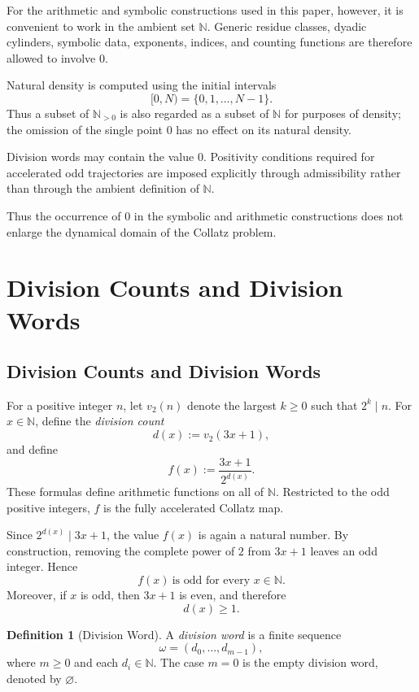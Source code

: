 \documentclass[12pt, oneside]{article}
\numberwithin{equation}{section}
\theoremstyle{definition}
\newtheorem{definition}{Definition}[section]
\theoremstyle{plain}
\theoremstyle{remark}
\begin{document}
For the arithmetic and symbolic constructions used in this paper, however,
it is convenient to work in the ambient set \(\mathbb N\). Generic residue
classes, dyadic cylinders, symbolic data, exponents, indices, and counting
functions are therefore allowed to involve \(0\).

Natural density is computed using the initial intervals
\[
[0,N)=\{0,1,\ldots,N-1\}.
\]
Thus a subset of \(\mathbb N_{>0}\) is also regarded as a subset of
\(\mathbb N\) for purposes of density; the omission of the single point
\(0\) has no effect on its natural density.

Division words may contain the value \(0\). Positivity conditions required
for accelerated odd trajectories are imposed explicitly through
admissibility rather than through the ambient definition of \(\mathbb N\).

Thus the occurrence of \(0\) in the symbolic and arithmetic constructions
does not enlarge the dynamical domain of the Collatz problem.


\section{Division Counts and Division Words}
\label{sec:division-counts}

\subsection{Division Counts and Division Words}

For a positive integer \(n\), let \(v_2(n)\) denote the largest
\(k\ge0\) such that \(2^k\mid n\). For \(x\in\mathbb N\), define the
\emph{division count}
\[
d(x):=v_2(3x+1),
\]
and define
\[
f(x):=\frac{3x+1}{2^{d(x)}}.
\]
These formulas define arithmetic functions on all of \(\mathbb N\).
Restricted to the odd positive integers, \(f\) is the fully accelerated
Collatz map.

Since \(2^{d(x)}\mid 3x+1\), the value \(f(x)\) is again a natural number.
By construction, removing the complete power of \(2\) from \(3x+1\) leaves
an odd integer. Hence
\[
f(x)\ \text{is odd for every }x\in\mathbb N.
\]
Moreover, if \(x\) is odd, then \(3x+1\) is even, and therefore
\[
d(x)\ge1.
\]

\begin{definition}[Division Word]
A \emph{division word} is a finite sequence
\[
\omega=(d_0,\dots,d_{m-1}),
\]
where \(m\ge0\) and each \(d_i\in\mathbb N\).
The case \(m=0\) is the empty division word, denoted by
\(\varnothing\).
\end{definition}
\end{document}
